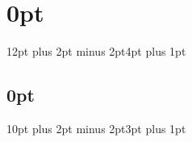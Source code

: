 
\usepackage{titlesec}
\titlespacing\section{0pt}{12pt plus 2pt minus 2pt}{4pt plus 1pt}
\titlespacing\subsection{0pt}{10pt plus 2pt minus 2pt}{3pt plus 1pt}

\usepackage{graphicx}
